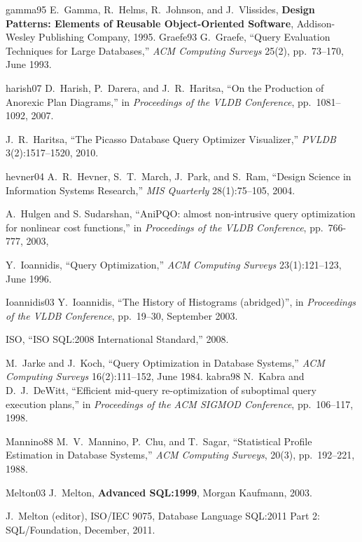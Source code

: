 \documentclass[prodmode,acmtods]{acmsmall}
\begin{document}
\begin{thebibliography}{99}
{\bibitem
{gamma95}
E.~Gamma, R.~Helms, R.~Johnson, and J.~Vlissides, {\bf Design Patterns:
  Elements of Reusable Object-Oriented Software}, Addison-Wesley Publishing
Company, 1995.
}
\bibitem
{Graefe93}
G.~Graefe, ``Query Evaluation Techniques for Large Databases,'' {\em ACM
  Computing Surveys} 25(2), pp.~73--170, June 1993.

\bibitem
{harish07}
D.~Harish, P.~Darera, and J.~R.~Haritsa, ``On the Production of Anorexic
Plan Diagrams,'' in {\em Proceedings of the VLDB Conference},
pp.~1081--1092, 2007.

J.~R.~Haritsa, ``The Picasso Database Query Optimizer Visualizer,'' {\em
  PVLDB} 3(2):1517--1520, 2010.

\bibitem
{hevner04}
A.~R.~Hevner, S.~T.~March, J.~Park, and S.~Ram, ``Design Science in
Information Systems Research,'' {\em MIS Quarterly} 28(1):75--105, 2004.

A.~Hulgen and S. Sudarshan, ``AniPQO: almost non-intrusive query optimization
for nonlinear cost functions,'' in {\em Proceedings of the VLDB Conference},
pp.~766-777, 2003,

Y.~Ioannidis, ``Query Optimization,'' {\em ACM Computing Surveys}
23(1):121--123, June 1996.

\bibitem
{Ioannidis03}
Y.~Ioannidis, ``The History of Histograms (abridged)'', in {\em Proceedings
  of the VLDB Conference}, pp.~19--30, September 2003.

ISO, ``ISO SQL:2008 International Standard,'' 2008.

M.~Jarke and J.~Koch, ``Query Optimization in Database Systems,'' {\em ACM
  Computing Surveys} 16(2):111--152, June 1984.
\bibitem
{kabra98}
N.~Kabra and D.~J.~DeWitt, ``Efficient mid-query re-optimization of
suboptimal query execution plans,'' in {\em Proceedings of the ACM SIGMOD Conference}, pp.~106--117, 1998.

\bibitem
{Mannino88}
M.~V.~Mannino, P.~Chu, and T.~Sagar, ``Statistical Profile Estimation in
Database Systems,'' {\em ACM Computing Surveys}, 20(3), pp.~192--221, 1988.

\bibitem
{Melton03}
J.~Melton, {\bf Advanced SQL:1999}, Morgan Kaufmann, 2003.

J.~Melton (editor), ISO/IEC 9075, Database Language SQL:2011 Part 2:
SQL/Foundation, December, 2011.


\end{thebibliography}
\end{document}
